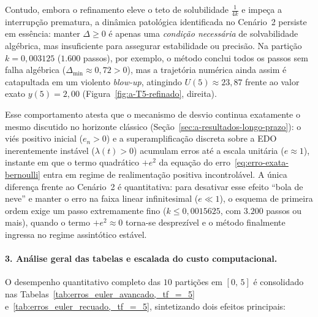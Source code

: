 \documentclass[12pt, a4paper]{article}
\begin{document}
Contudo, embora o refinamento eleve o teto de solubilidade $\frac{1}{4k}$ e impeça a interrupção prematura, a dinâmica patológica identificada no Cenário~2 persiste em essência: manter $\Delta \ge 0$ é apenas uma \emph{condição necessária} de solvabilidade algébrica, mas insuficiente para assegurar estabilidade ou precisão. Na partição $k = 0{,}003125$ ($1.600$ passos), por exemplo, o método conclui todos os passos sem falha algébrica ($\Delta_{\min} \approx 0{,}72 > 0$), mas a trajetória numérica ainda assim é catapultada em um violento \emph{blow-up}, atingindo $U(5) \approx 23{,}87$ frente ao valor exato $y(5) = 2{,}00$ (Figura~\ref{fig:a-T5-refinado}, direita).

Esse comportamento atesta que o mecanismo de desvio continua exatamente o mesmo discutido no horizonte clássico (Seção~\ref{sec:a-resultados-longo-prazo}): o viés positivo inicial ($e_n > 0$) e a superamplificação discreta sobre a EDO inerentemente instável ($\lambda(t) > 0$) acumulam erros até a escala unitária ($e \approx 1$), instante em que o termo quadrático $+e^2$ da equação do erro~\eqref{eq:erro-exata-bernoulli} entra em regime de realimentação positiva incontrolável. A única diferença frente ao Cenário~2 é quantitativa: para desativar esse efeito ``bola de neve'' e manter o erro na faixa linear infinitesimal ($e \ll 1$), o esquema de primeira ordem exige um passo extremamente fino ($k \le 0{,}0015625$, com $3.200$ passos ou mais), quando o termo $+e^2 \approx 0$ torna-se desprezível e o método finalmente ingressa no regime assintótico estável.

\paragraph{3. Análise geral das tabelas e escalada do custo computacional.}
O desempenho quantitativo completo das $10$ partições em $[0,\, 5]$ é consolidado nas Tabelas~\ref{tab:erros_euler_avancado,_tf_=_5} e~\ref{tab:erros_euler_recuado,_tf_=_5}, sintetizando dois efeitos principais:



\end{document}
